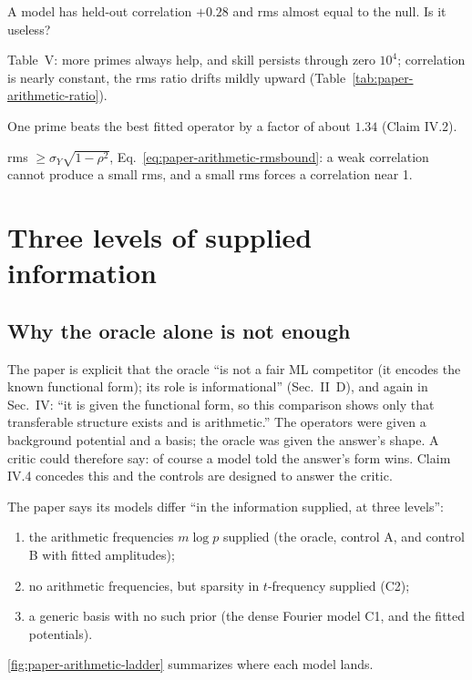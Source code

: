\begin{checkpoint}
A model has held-out correlation $+0.28$ and rms almost equal to the null. Is it useless?
\end{checkpoint}

\begin{keyideas}
\item Table~V: more primes always help, and skill persists through zero $10^4$; correlation is nearly constant, the rms ratio drifts mildly upward (Table~\ref{tab:paper-arithmetic-ratio}).
\item One prime beats the best fitted operator by a factor of about $1.34$ (Claim IV.2).
\item rms $\ge\sigma_Y\sqrt{1-\rho^2}$, Eq.~\eqref{eq:paper-arithmetic-rmsbound}: a weak correlation cannot produce a small rms, and a small rms forces a correlation near 1.
\end{keyideas}

\section{Three levels of supplied information}\label{sec:paper-arithmetic-levels}

\subsection{Why the oracle alone is not enough}

The paper is explicit that the oracle ``is not a fair ML competitor (it encodes the known functional form); its role is informational'' (Sec.~II~D), and again in Sec.~IV: ``it is given the functional form, so this comparison shows only that transferable structure exists and is arithmetic.'' The operators were given a background potential and a basis; the oracle was given the answer's shape. A critic could therefore say: of course a model told the answer's form wins. Claim IV.4 concedes this and the controls are designed to answer the critic.

The paper says its models differ ``in the information supplied, at three levels'':
\begin{enumerate}
\item[(i)] the arithmetic frequencies $m\log p$ supplied (the oracle, control A, and control B with fitted amplitudes);
\item[(ii)] no arithmetic frequencies, but sparsity in $t$-frequency supplied (C2);
\item[(iii)] a generic basis with no such prior (the dense Fourier model C1, and the fitted potentials).
\end{enumerate}
\cref{fig:paper-arithmetic-ladder} summarizes where each model lands.

